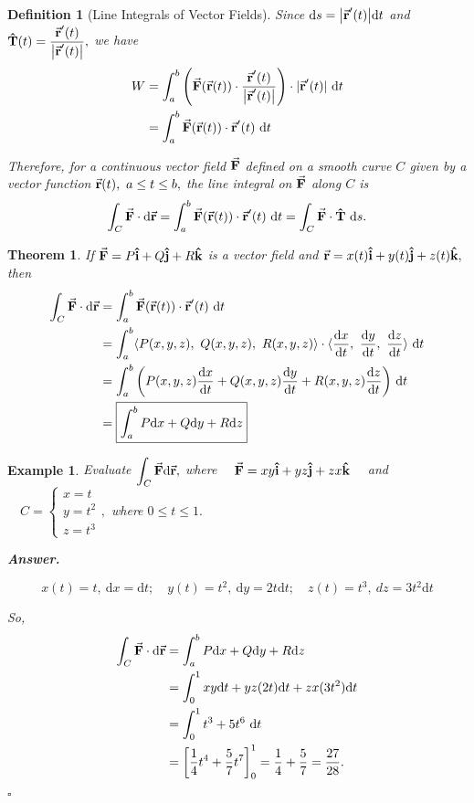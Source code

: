 \documentclass[12pt,a4paper]{article}
\newtheorem{thm}{Theorem}[subsection]
\newtheorem{df}{Definition}[subsection]
\newtheorem{eg}{Example}[subsection]
\newenvironment*{ans}{\par\indent\textbf{\textit{Answer. }}\par}{\par\hfill{$\square$}\par}
\def\dsst{\displaystyle}
\def\d{{\mathrm{d}}}
\def\dx{\d x}
\def\dy{\d y}
\def\dz{\d z}
\def\ds{\d s}
\def\dt{\d t}
\def\intC{\dsst\int_C}
\def\vecr{\va{{\textbf{r}}}}
\def\veci{\vu{\boldsymbol{\textbf{i}}}}
\def\vecj{\vu{\boldsymbol{\textbf{j}}}}
\def\veck{\vu{\boldsymbol{\textbf{k}}}}
\def\F{\va{\boldsymbol{\textbf{F}}}}
\def\T{\vu{\boldsymbol{\textbf{T}}}}
\begin{document}
\begin{df}[Line Integrals of Vector Fields]
	\noindent Since $\ds=\qty|\vecr'(t)|\dt$ and $\T(t)=\dfrac{\vecr'(t)}{\qty|\vecr'(t)|},$ we have \[\begin{aligned}W&=\int_a^b\qty(\F(\vecr(t))\cdot\dfrac{\vecr'(t)}{\qty|\vecr'(t)|})\cdot|\vecr'(t)|\ \dt\\&=\int_a^b\F(\vecr(t))\cdot\vecr'(t)\ \dt\end{aligned}\]
	\begin{framed}
	\noindent Therefore, for a continuous vector field $\F$ defined on a smooth curve $C$ given by a vector function $\vecr(t),\ a\leq t\leq b,$ the line integral on $\F$ along $C$ is \[\intC\F\cdot\d\vecr=\int_a^b\F(\vecr(t))\cdot\vecr'(t)\ \dt=\intC\F\cdot\T\ \ds.\] 
	\end{framed}
\end{df}
\begin{thm}
	If $\F=P\veci+Q\vecj+R\veck$ is a vector field and $\vecr=x(t)\veci+y(t)\vecj+z(t)\veck,$ then \[\begin{aligned}\intC\F\cdot\d\vecr&=\int_a^b\F(\vecr(t))\cdot\vecr'(t)\ \dt\\&=\int_a^b\langle P(x,y,z),\ Q(x,y,z),\ R(x,y,z)\rangle\cdot\langle\dv{x}{t},\ \dv{y}{t},\ \dv{z}{t}\rangle\ \dt\\&=\int_a^b\qty(P(x,y,z)\dv{x}{t}+Q(x,y,z)\dv{y}{t}+R(x,y,z)\dv{z}{t})\ \dt\\&=\boxed{\int_a^bP\dx+Q\dy+R\dz}\end{aligned}\]	
\end{thm}
\begin{eg}
	Evaluate $\intC\F\d\vecr,$ where $\quad\F=xy\veci+yz\vecj+zx\veck\quad$ and $\quad C=\begin{cases}x=t\\y=t^2\\z=t^3\end{cases},$ where $0\leq t\leq1.$
	\begin{ans}
		\[x(t)=t,\ \dx=\dt;\quad y(t)=t^2,\ \dy=2t\dt;\quad z(t)=t^3,\ dz=3t^2\dt\]\par So, \[\begin{aligned}\intC\F\cdot\d\vecr&=\int_a^bP\dx+Q\dy+R\dz\\&=\int_0^1xy\dt+yz(2t)\dt+zx(3t^2)\dt\\&=\int_0^1t^3+5t^6\ \dt\\&=\qty[\dfrac{1}{4}t^4+\dfrac{5}{7}t^7]_0^1=\dfrac{1}{4}+\dfrac{5}{7}=\dfrac{27}{28}.\end{aligned}\]
	\end{ans}
\end{eg}
\end{document}
